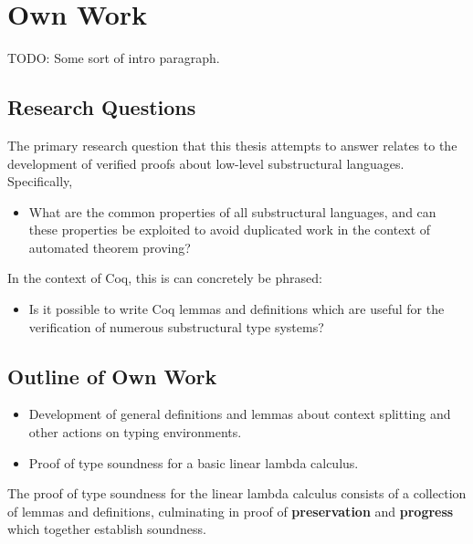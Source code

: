 \documentclass[]{unswthesis}
\begin{document}
\chapter{Own Work}

TODO: Some sort of intro paragraph.

\section{Research Questions}

The primary research question that this thesis attempts to answer relates to the development of verified proofs about low-level substructural languages. Specifically,

\begin{itemize}
\item What are the common properties of all substructural languages, and can these properties be exploited to avoid duplicated work in the context of automated theorem proving?
\end{itemize}

In the context of Coq, this is can concretely be phrased:

\begin{itemize}
\item Is it possible to write Coq lemmas and definitions which are useful for the verification of numerous substructural type systems?
\end{itemize}



\section{Outline of Own Work}

\begin{itemize}
\item Development of general definitions and lemmas about context splitting and other actions on typing environments.
\item Proof of type soundness for a basic linear lambda calculus.
\end{itemize}

The proof of type soundness for the linear lambda calculus consists of a collection of lemmas and definitions, culminating in proof of \textbf{preservation} and \textbf{progress} which together establish soundness.
\end{document}
